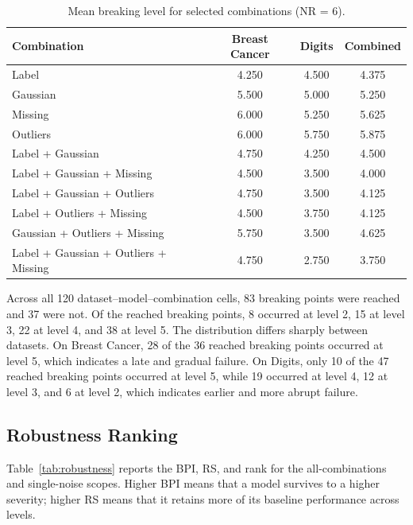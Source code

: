 \begin{table}[H]
\centering
\caption{Mean breaking level for selected combinations (NR = 6).}
\label{tab:keycombos}
\footnotesize
\begin{tabular}{lccc}
\toprule
\textbf{Combination} & \textbf{Breast Cancer} & \textbf{Digits} & \textbf{Combined} \\
\midrule
Label & 4.250 & 4.500 & 4.375 \\
Gaussian & 5.500 & 5.000 & 5.250 \\
Missing & 6.000 & 5.250 & 5.625 \\
Outliers & 6.000 & 5.750 & 5.875 \\
Label + Gaussian & 4.750 & 4.250 & 4.500 \\
Label + Gaussian + Missing & 4.500 & 3.500 & 4.000 \\
Label + Gaussian + Outliers & 4.750 & 3.500 & 4.125 \\
Label + Outliers + Missing & 4.500 & 3.750 & 4.125 \\
Gaussian + Outliers + Missing & 5.750 & 3.500 & 4.625 \\
Label + Gaussian + Outliers + Missing & 4.750 & 2.750 & 3.750 \\
\bottomrule
\end{tabular}
\end{table}

Across all 120 dataset--model--combination cells, 83 breaking points were reached and 37 were not. Of the reached breaking points, 8 occurred at level 2, 15 at level 3, 22 at level 4, and 38 at level 5. The distribution differs sharply between datasets. On Breast Cancer, 28 of the 36 reached breaking points occurred at level 5, which indicates a late and gradual failure. On Digits, only 10 of the 47 reached breaking points occurred at level 5, while 19 occurred at level 4, 12 at level 3, and 6 at level 2, which indicates earlier and more abrupt failure.

\subsection{Robustness Ranking}

Table~\ref{tab:robustness} reports the BPI, RS, and rank for the all-combinations and single-noise scopes. Higher BPI means that a model survives to a higher severity; higher RS means that it retains more of its baseline performance across levels.

